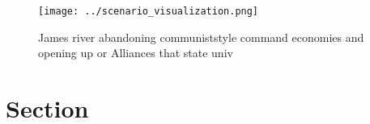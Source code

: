 \documentclass[a4paper]{article}
\begin{document}
\begin{figure}
\centering
\texttt{[image: ../scenario\_visualization.png]}
\caption{James river abandoning communiststyle command economies and opening up or Alliances that state univ
}
\end{figure}
 
\section{Section}
\end{document}
